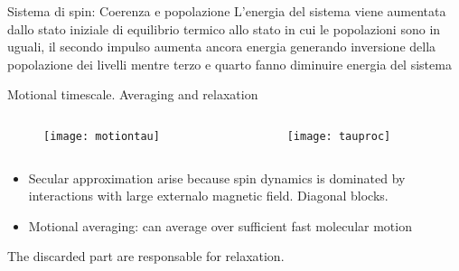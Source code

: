\begin{wordonframe}{Sistema di spin: Coerenza e popolazione}
L'energia del sistema viene aumentata dallo stato iniziale di equilibrio termico allo stato in cui le popolazioni sono in uguali, il secondo impulso aumenta ancora energia generando inversione della popolazione dei livelli mentre terzo e quarto fanno diminuire energia del sistema
\end{wordonframe}

\begin{frame}{Motional timescale. Averaging and relaxation}

    \begin{columns}[T]
    \begin{column}{0.5\textwidth}
    \begin{figure}
    \centering
    \texttt{[image: motiontau]}
    \label{fig:motiontau}
\end{figure}
    \end{column}
        \begin{column}{0.5\textwidth}
    \begin{figure}
    \centering
    \texttt{[image: tauproc]}
    \label{fig:tauproc}
\end{figure}
    \end{column}
    \end{columns}
    \begin{itemize}
    \item Secular approximation arise because spin dynamics is dominated by interactions with large externalo magnetic field. Diagonal blocks.
    \item Motional averaging: can average over sufficient fast molecular motion
\end{itemize}
The discarded part are responsable for relaxation.
\end{frame}

